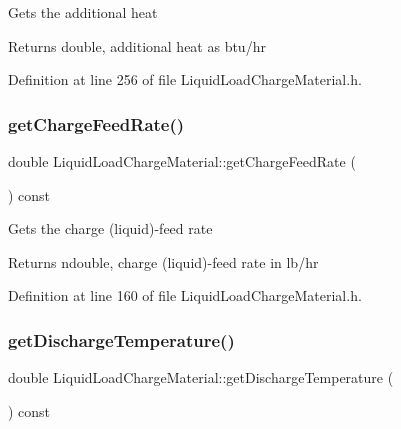 Gets the additional heat \begin{DoxyReturn}{Returns}
double, additional heat as btu/hr 
\end{DoxyReturn}


Definition at line 256 of file Liquid\+Load\+Charge\+Material.\+h.

\mbox{\label{class_liquid_load_charge_material_af818c541527b3b28a8f84a08dc0c884e}} 
\subsubsection{\texorpdfstring{get\+Charge\+Feed\+Rate()}{getChargeFeedRate()}}
{\footnotesize\ttfamily double Liquid\+Load\+Charge\+Material\+::get\+Charge\+Feed\+Rate (\begin{DoxyParamCaption}{ }\end{DoxyParamCaption}) const\hspace{0.3cm}{\ttfamily [inline]}}

Gets the charge (liquid)-\/feed rate \begin{DoxyReturn}{Returns}
ndouble, charge (liquid)-\/feed rate in lb/hr 
\end{DoxyReturn}


Definition at line 160 of file Liquid\+Load\+Charge\+Material.\+h.

\mbox{\label{class_liquid_load_charge_material_ad474f33059c99aa94e1d63738e11ff0e}} 
\subsubsection{\texorpdfstring{get\+Discharge\+Temperature()}{getDischargeTemperature()}}
{\footnotesize\ttfamily double Liquid\+Load\+Charge\+Material\+::get\+Discharge\+Temperature (\begin{DoxyParamCaption}{ }\end{DoxyParamCaption}) const\hspace{0.3cm}{\ttfamily [inline]}}

